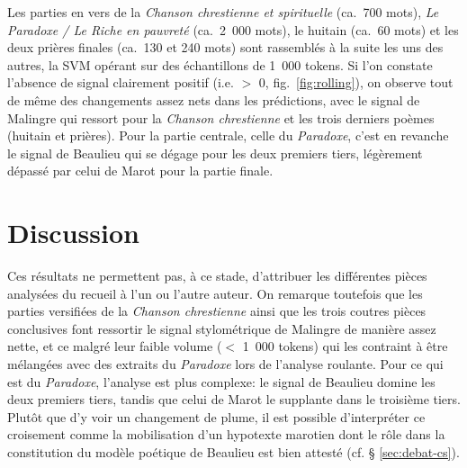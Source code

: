 \documentclass[final, fra]{anthology-ch}
\begin{document}
Les parties en vers de la \textit{Chanson chrestienne et spirituelle} (ca.~700 mots), \textit{Le Paradoxe / Le Riche en pauvreté} (ca.~2~000 mots), le huitain (ca.~60 mots) et les deux prières finales (ca.~130 et 240 mots) sont rassemblés à la suite les uns des autres, la SVM opérant sur des échantillons de 1~000 tokens. Si l'on constate l'absence de signal clairement positif (i.e. $>$ 0, fig.~\ref{fig:rolling}), on observe tout de même des changements assez nets dans les prédictions, avec le signal de Malingre qui ressort pour la \textit{Chanson chrestienne} et les trois derniers poèmes (huitain et prières). Pour la partie centrale, celle du \textit{Paradoxe}, c'est en revanche le signal de Beaulieu qui se dégage pour les deux premiers tiers, légèrement dépassé par celui de Marot pour la partie finale.

\section{Discussion} \label{sec:conclusions}

Ces résultats ne permettent pas, à ce stade, d'attribuer les différentes pièces analysées du recueil à l'un ou l'autre auteur. On remarque toutefois que les parties versifiées de la \textit{Chanson chrestienne} ainsi que les trois coutres pièces conclusives font ressortir le signal stylométrique de Malingre de manière assez nette, et ce malgré leur faible volume ($<$ 1~000 tokens) qui les contraint à être mélangées avec des extraits du \textit{Paradoxe} lors de l'analyse roulante. 
Pour ce qui est du \textit{Paradoxe}, l'analyse est plus complexe: le signal de Beaulieu domine les deux premiers tiers, tandis que celui de Marot le supplante dans le troisième tiers. Plutôt que d'y voir un changement de plume, il est possible d'interpréter ce croisement comme la mobilisation d'un hypotexte marotien dont le rôle dans la constitution du modèle poétique de Beaulieu est bien attesté (cf. § \ref{sec:debat-cs}).

\end{document}
